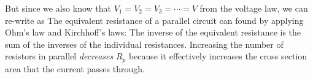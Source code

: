But since we also know that $V_1=V_2=V_3=\cdots=V$ from the voltage law, we
can re-write as
%
The equivalent resistance of a parallel circuit can found by applying Ohm's law
and Kirchhoff's laws: The inverse of the equivalent resistance is the sum of
the inverses of the individual resistances.
%
Increasing the number of resistors in parallel \emph{decreases} $R_p$ because
it effectively increases the cross section area that the current passes through.

%
%    
%
%    
%    
%
%  
%
%
%
%
